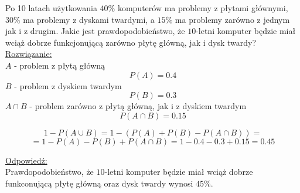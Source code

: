 \begin{zad}
Po 10 latach użytkowania $40\%$ komputerów ma problemy z płytami głównymi, $30\%$ ma problemy z dyskami twardymi, a $15\%$ ma problemy zarówno z jednym jak i z drugim. Jakie jest prawdopodobieństwo, że $10$-letni komputer będzie miał wciąż dobrze funkcjonującą zarówno płytę główną, jak i dysk twardy? \\


\underline{Rozwiązanie:}
$$
$$
$A$ - problem z płytą główną
$$
P(A)=0.4
$$
$B$ - problem z dyskiem twardym
$$
P(B)=0.3
$$
$A \cap B$ - problem zarówno z płytą główną, jak i z dyskiem twardym
$$
P( A \cap B ) = 0.15
$$

$$
1 - P( A \cup B ) = 1 - ( P(A) + P(B) - P( A \cap B ) ) = 
$$
$$
= 1 - P(A) - P(B) + P( A \cap B ) = 1 - 0.4 - 0.3 + 0.15 = 0.45
$$

\underline{Odpowiedź:} \\

Prawdopodobieństwo, że $10$-letni komputer będzie miał wciąż dobrze funkconującą płytę główną oraz dysk twardy wynosi $45\%$.

\end{zad}
